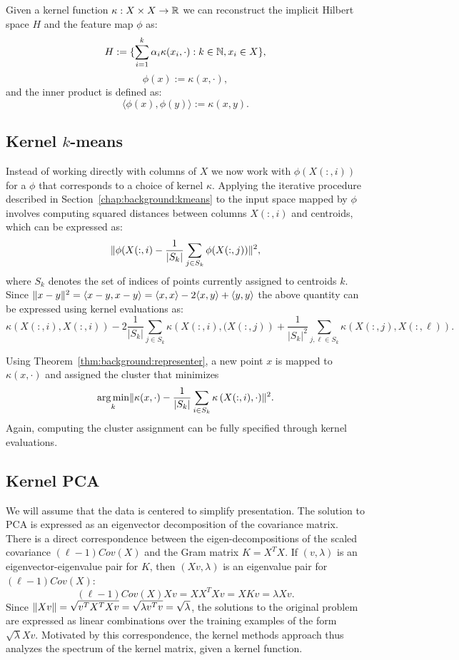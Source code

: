 \begin{theorem}\label{thm:background:representer}
Given a kernel function $\kappa: X \times X \rightarrow \mathbb{R}$ we can reconstruct the implicit Hilbert space $H$ and the feature map $\phi$ as:
$$ H := \{ \sum_{i=1}^k \alpha_i \kappa(x_i, \cdot): k \in \mathbb{N}, x_i \in X \},$$
$$ \phi(x) := \kappa(x, \cdot), $$ and the inner product is defined as:
$$ \langle \phi(x), \phi(y) \rangle := \kappa(x,y).$$
\end{theorem}

\subsection{Kernel $k$-means}

Instead of working directly with columns of $X$ we now work with $\phi\left(X(:,i)\right)$ for a $\phi$ that corresponds to a choice of kernel $\kappa$.
Applying the iterative procedure described in Section~\ref{chap:background:kmeans} to the input space mapped by $\phi$ involves computing squared distances between columns $X(:,i)$ and centroids, which can be expressed as:
$$ \lVert \phi(X(:,i) - \frac{1}{|S_k|} \sum_{j \in S_k} \phi(X(:,j)) \rVert^2,$$
where $S_k$ denotes the set of indices of points currently assigned to centroids $k$.
Since $\lVert x - y\rVert^2 = \langle x-y, x-y \rangle = \langle x,x \rangle - 2 \langle x, y \rangle + \langle y, y \rangle$
the above quantity can be expressed using kernel evaluations as:
$$ \kappa\left(X(:,i),X(:,i)\right) - 2 \frac{1}{|S_k|} \sum_{j \in S_k} \kappa\left(X(:,i), (X(:,j) \right) + \frac{1}{|S_k|^2} \sum_{j,\ell \in S_k} \kappa\left( X(:,j), X(:,\ell) \right).$$

Using Theorem~\ref{thm:background:representer}, a new point $x$ is mapped to $\kappa(x, \cdot)$ and assigned the cluster that
minimizes
$$ \operatorname*{arg\,min}_k \lVert \kappa(x,\cdot) - \frac{1}{|S_k|} \sum_{i \in S_k} \kappa\left(X(:,i), \cdot\right)\rVert^2.$$
Again, computing the cluster assignment can be fully specified through kernel evaluations.

\subsection{Kernel PCA}

We will assume that the data is centered to simplify presentation.
The solution to PCA is expressed as an eigenvector decomposition of the covariance matrix. There is a direct correspondence between
the eigen-decompositions of the scaled covariance $(\ell - 1) Cov(X)$ and the Gram matrix $K = X^T X$.
If $(v, \lambda)$ is an eigenvector-eigenvalue pair for $K$, then $(X v, \lambda)$ is an eigenvalue pair for $(\ell - 1) Cov(X)$:
$$ (\ell - 1) Cov(X) X v = X X^T X v = X K v = \lambda X v.$$
Since $\lVert X v\rVert = \sqrt{v^T X^T X v} = \sqrt{ \lambda v^T v } = \sqrt{\lambda}$,
the solutions to the original problem are expressed as linear combinations over the training examples of the form $\sqrt{\lambda}X v$.
Motivated by this correspondence, the kernel methods approach thus analyzes the spectrum of the kernel matrix, given a kernel function.


